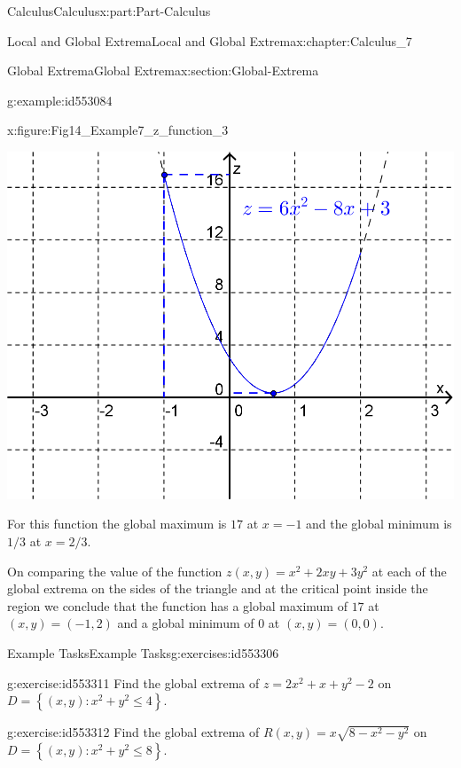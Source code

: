 \documentclass[oneside,10pt,]{book}
\numberwithin{equation}{section}
\begin{document}
\begin{partptx}{Calculus}{}{Calculus}{}{}{x:part:Part-Calculus}
\begin{chapterptx}{Local and Global Extrema}{}{Local and Global Extrema}{}{}{x:chapter:Calculus_7}
\begin{sectionptx}{Global Extrema}{}{Global Extrema}{}{}{x:section:Global-Extrema}
\begin{example}{}{g:example:id553084}
%
\begin{figureptx}{}{x:figure:Fig14_Example7_z_function_3}{}%
\begin{image}{0.2}{0.6}{0.2}%
\includegraphics[width=\linewidth]{./Calculus/Images/7/Fig14_Example7_z_function_3.png}
\end{image}%
\tcblower
\end{figureptx}%
For this function the global maximum is \(17\) at \(x=-1\) and the global minimum is \(1/3\) at \(x=2/3\).%
\par
On comparing the value of the function \(z(x,y) = x^2 + 2xy + 3y^2\) at each of the global extrema on the sides of the triangle and at the critical point inside the region we conclude that the function has a global maximum of \(17\) at \((x,y) = (-1,2)\) and a global minimum of \(0\) at \((x,y)=(0,0)\).%
\end{example}
%
%
\typeout{************************************************}
\typeout{************************************************}
%
\begin{exercises-subsection-numberless}{Example Tasks}{}{Example Tasks}{}{}{g:exercises:id553306}
\begin{divisionexercise}{1}{}{}{g:exercise:id553311}%
Find the global extrema of \(z=2x^2 + x +y^2 - 2\) on \(D = \left \{ (x,y): x^2+y^2 \leq 4 \right \}\).%
\end{divisionexercise}%
\begin{divisionexercise}{2}{}{}{g:exercise:id553312}%
Find the global extrema of \(R(x,y) = x \sqrt{8-x^2-y^2}\) on \(D = \left \{ (x,y): x^2+y^2 \leq 8 \right \}\).%

\end{divisionexercise}
\end{exercises-subsection-numberless}
\end{sectionptx}
\end{chapterptx}
\end{partptx}
\end{document}
